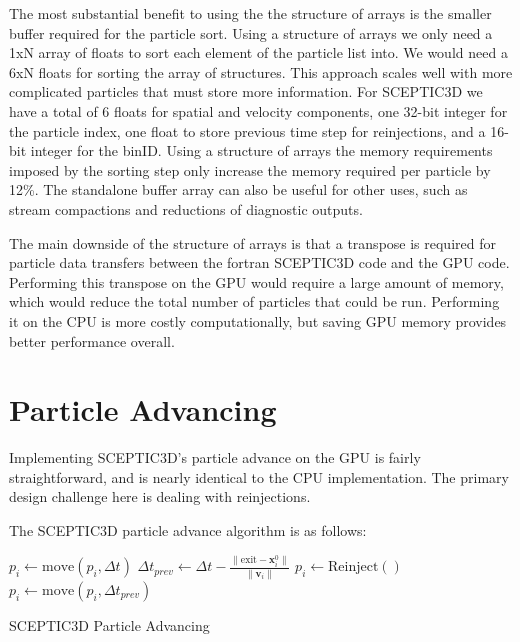 The most substantial benefit to using the the structure of arrays is the smaller buffer required for the particle sort. Using a structure of arrays we only need a 1xN array of floats to sort each element of the particle list into. We would need a 6xN floats for sorting the array of structures. This approach scales well with more complicated particles that must store more information. For SCEPTIC3D we have a total of 6 floats for spatial and velocity components, one 32-bit integer for the particle index, one float to store previous time step for reinjections, and a 16-bit integer for the binID. Using a structure of arrays the memory requirements imposed by the sorting step only increase the memory required per particle by 12\%. The standalone buffer array can also be useful for other uses, such as stream compactions and reductions of diagnostic outputs. 

The main downside of the structure of arrays is that a transpose is required for particle data transfers between the fortran SCEPTIC3D code and the GPU code. Performing this transpose on the GPU would require a large amount of memory, which would reduce the total number of particles that could be run. Performing it on the CPU is more costly computationally, but saving GPU memory provides better performance overall.  




	\section{Particle Advancing}
	Implementing SCEPTIC3D's particle advance on the GPU is fairly straightforward, and is nearly identical to the CPU implementation. The primary design challenge here is dealing with reinjections.

The SCEPTIC3D particle advance algorithm is as follows:

\begin{algorithm}
	\begin{algorithmic}
		\STATE $p_i \leftarrow \mathrm{move}(p_i,\Delta t)$
			\STATE $\Delta t_{prev} \leftarrow \Delta t - \frac{\|\mathbf{\mathrm{exit}} - \mathbf{x}_i^0\|}{\|\mathbf{v}_i\|}$
			\STATE $p_i \leftarrow \mathrm{Reinject}()$
			\STATE $p_i \leftarrow \mathrm{move}(p_i,\Delta t_{prev})$
		\ENDWHILE	
		\ENDFOR
	\end{algorithmic}
	\caption{SCEPTIC3D Particle Advancing}
	\label{alg:padvnc}
\end{algorithm}

